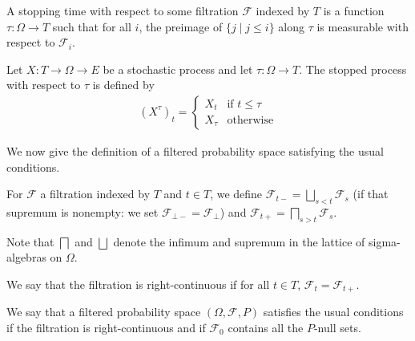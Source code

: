 \begin{definition}\label{def:IsStoppingTime}
  \mathlibok
A stopping time with respect to some filtration $\mathcal{F}$ indexed by $T$ is a function $\tau : \Omega \to T$ such that for all $i$, the preimage of $\{j \mid j \le i\}$ along $\tau$ is measurable with respect to $\mathcal{F}_i$.
\end{definition}


\begin{definition}\label{def:stoppedProcess}
  \mathlibok
Let $X : T \to \Omega \to E$ be a stochastic process and let $\tau : \Omega \to T$.
The stopped process with respect to $\tau$ is defined by
\begin{align*}
  (X^{\tau})_t = \begin{cases}
    X_t & \text{if } t \le \tau \\
    X_{\tau} & \text{otherwise}
  \end{cases}
\end{align*}
\end{definition}


We now give the definition of a filtered probability space satisfying the usual conditions.


\begin{definition}\label{def:leftRightLimitFiltration}
For $\mathcal{F}$ a filtration indexed by $T$ and $t \in T$, we define $\mathcal{F}_{t-} = \bigsqcup_{s < t} \mathcal{F}_s$ (if that supremum is nonempty: we set $\mathcal{F}_{\bot-} = \mathcal{F}_\bot$) and $\mathcal{F}_{t+} = \bigsqcap_{s > t} \mathcal{F}_s$.

Note that $\bigsqcap$ and $\bigsqcup$ denote the infimum and supremum in the lattice of sigma-algebras on $\Omega$.
\end{definition}


\begin{definition}\label{def:rightContinuous}
  \leanok
We say that the filtration is right-continuous if for all $t \in T$, $\mathcal{F}_t = \mathcal{F}_{t+}$.
\end{definition}


\begin{definition}\label{def:usualConditions}
  \leanok
We say that a filtered probability space $(\Omega, \mathcal{F}, P)$ satisfies the usual conditions if the filtration is right-continuous and if $\mathcal{F}_0$ contains all the $P$-null sets.
\end{definition}


